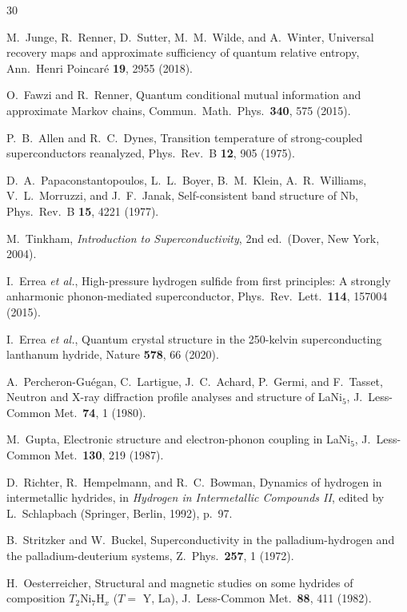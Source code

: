 \documentclass[prb,twocolumn,superscriptaddress,longbibliography,floatfix]{revtex4-2}
\begin{document}
\begin{thebibliography}{30}

M.~Junge, R.~Renner, D.~Sutter, M.~M.~Wilde, and A.~Winter,
Universal recovery maps and approximate sufficiency of quantum relative entropy,
Ann.\ Henri Poincar\'e \textbf{19}, 2955 (2018).

O.~Fawzi and R.~Renner,
Quantum conditional mutual information and approximate Markov chains,
Commun.\ Math.\ Phys.\ \textbf{340}, 575 (2015).

P.~B.~Allen and R.~C.~Dynes,
Transition temperature of strong-coupled superconductors reanalyzed,
Phys.\ Rev.\ B \textbf{12}, 905 (1975).

D.~A.~Papaconstantopoulos, L.~L.~Boyer, B.~M.~Klein, A.~R.~Williams,
V.~L.~Morruzzi, and J.~F.~Janak,
Self-consistent band structure of Nb,
Phys.\ Rev.\ B \textbf{15}, 4221 (1977).

M.~Tinkham,
\textit{Introduction to Superconductivity}, 2nd ed.\ (Dover, New York, 2004).

I.~Errea \textit{et al.},
High-pressure hydrogen sulfide from first principles: A strongly anharmonic
phonon-mediated superconductor,
Phys.\ Rev.\ Lett.\ \textbf{114}, 157004 (2015).

I.~Errea \textit{et al.},
Quantum crystal structure in the 250-kelvin superconducting lanthanum hydride,
Nature \textbf{578}, 66 (2020).

A.~Percheron-Gu\'egan, C.~Lartigue, J.~C.~Achard, P.~Germi, and F.~Tasset,
Neutron and X-ray diffraction profile analyses and structure of LaNi$_5$,
J.\ Less-Common Met.\ \textbf{74}, 1 (1980).

M.~Gupta,
Electronic structure and electron-phonon coupling in LaNi$_5$,
J.\ Less-Common Met.\ \textbf{130}, 219 (1987).

D.~Richter, R.~Hempelmann, and R.~C.~Bowman,
Dynamics of hydrogen in intermetallic hydrides,
in \textit{Hydrogen in Intermetallic Compounds II},
edited by L.~Schlapbach (Springer, Berlin, 1992), p.~97.

B.~Stritzker and W.~Buckel,
Superconductivity in the palladium-hydrogen and the
palladium-deuterium systems,
Z.\ Phys.\ \textbf{257}, 1 (1972).

H.~Oesterreicher,
Structural and magnetic studies on some hydrides of composition
$T_2$Ni$_7$H$_x$ ($T =$ Y, La),
J.\ Less-Common Met.\ \textbf{88}, 411 (1982).

\end{thebibliography}
\end{document}
